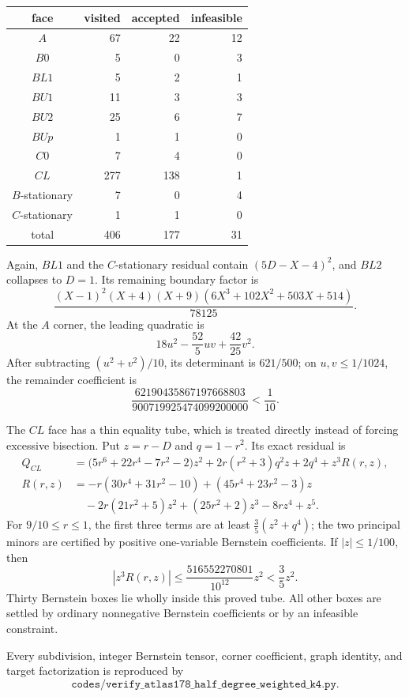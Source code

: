 \documentclass[11pt]{article}
\begin{document}
\begin{center}
\begin{tabular}{crrr}
\toprule
face & visited & accepted & infeasible\\
\midrule
\(A\)&67&22&12\\
\(B0\)&5&0&3\\
\(BL1\)&5&2&1\\
\(BU1\)&11&3&3\\
\(BU2\)&25&6&7\\
\(BUp\)&1&1&0\\
\(C0\)&7&4&0\\
\(CL\)&277&138&1\\
\(B\)-stationary&7&0&4\\
\(C\)-stationary&1&1&0\\
\midrule
total&406&177&31\\
\bottomrule
\end{tabular}
\end{center}
Again, \(BL1\) and the \(C\)-stationary residual contain
\((5D-X-4)^2\), and \(BL2\) collapses to \(D=1\).  Its remaining boundary
factor is
\[
 \frac{(X-1)^2(X+4)(X+9)
 (6X^3+102X^2+503X+514)}{78125}.
\]
At the \(A\) corner, the leading quadratic is
\[
 18u^2-\frac{52}{5}uv+\frac{42}{25}v^2.
\]
After subtracting \((u^2+v^2)/10\), its determinant is \(621/500\); on
\(u,v\leq1/1024\), the remainder coefficient is
\[
 \frac{62190435867197668803}{900719925474099200000}<\frac1{10}.
\]

The \(CL\) face has a thin equality tube, which is treated directly instead
of forcing excessive bisection.  Put \(z=r-D\) and \(q=1-r^2\).  Its exact
residual is
\begin{align*}
 Q_{CL}
 &=\bigl(5r^6+22r^4-7r^2-2\bigr)z^2
   +2r(r^2+3)q^2z+2q^4+z^3R(r,z),\\
 R(r,z)
 &=-r(30r^4+31r^2-10)
 +(45r^4+23r^2-3)z\\
 &\quad-2r(21r^2+5)z^2+(25r^2+2)z^3
 -8rz^4+z^5.
\end{align*}
For \(9/10\leq r\leq1\), the first three terms are at least
\(\frac35(z^2+q^4)\); the two principal minors are certified by positive
one-variable Bernstein coefficients.  If \(|z|\leq1/100\), then
\[
 |z^3R(r,z)|
 \leq
 \frac{516552270801}{10^{12}}z^2
 <\frac35z^2.
\]
Thirty Bernstein boxes lie wholly inside this proved tube.  All other boxes
are settled by ordinary nonnegative Bernstein coefficients or by an
infeasible constraint.

Every subdivision, integer Bernstein tensor, corner coefficient, graph
identity, and target factorization is reproduced by
\[
 \texttt{codes/verify\_atlas178\_half\_degree\_weighted\_k4.py}.
\]
\end{document}
